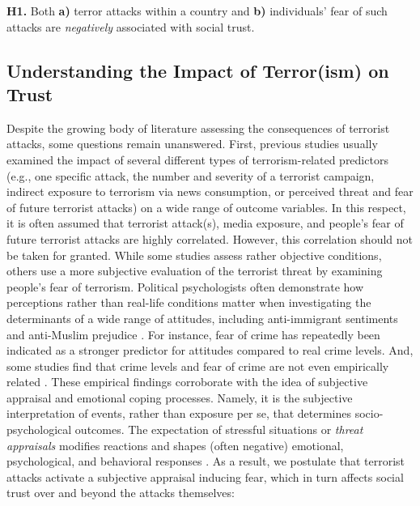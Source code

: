 \vspace{5mm}
\noindent\textbf{H1.} Both \textbf{a)} terror attacks within a country and \textbf{b)} individuals’ fear of such attacks are \textit{negatively} associated with social trust.


\subsection{Understanding the Impact of Terror(ism) on Trust}
Despite the growing body of literature assessing the consequences of terrorist attacks, some questions remain unanswered. First, previous studies usually examined the impact of several different types of terrorism-related predictors (e.g., one specific attack, the number and severity of a terrorist campaign, indirect exposure to terrorism via news consumption, or perceived threat and fear of future terrorist attacks) on a wide range of outcome variables. In this respect, it is often assumed that terrorist attack(s), media exposure, and people’s fear of future terrorist attacks are highly correlated. However, this correlation should not be taken for granted. While some studies assess rather objective conditions, others use a more subjective evaluation of the terrorist threat by examining people’s fear of terrorism. Political psychologists often demonstrate how perceptions rather than real-life conditions matter when investigating the determinants of a wide range of attitudes, including anti-immigrant sentiments \citep{Alba2005, Sides2007} and anti-Muslim prejudice \citep{Strabac2008}. For instance, fear of crime has repeatedly been indicated as a stronger predictor for attitudes compared to real crime levels. And, some studies find that crime levels and fear of crime are not even empirically related \citep{Romer2003}. These empirical findings corroborate with the idea of subjective appraisal and emotional coping processes. Namely, it is the subjective interpretation of events, rather than exposure per se, that determines socio-psychological outcomes. The expectation of stressful situations or \textit{threat appraisals} modifies reactions and shapes (often negative) emotional, psychological, and behavioral responses \citep{Folkman1986, Lazarus1987}. As a result, we postulate that terrorist attacks activate a subjective appraisal inducing fear, which in turn affects social trust over and beyond the attacks themselves:

